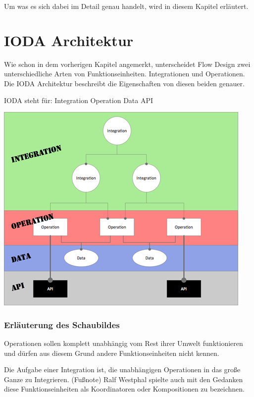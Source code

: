 Um was es sich dabei im Detail genau handelt, wird in diesem Kapitel erläutert.

\pagebreak
\section{IODA Architektur}

Wie schon in dem vorherigen Kapitel angemerkt, unterscheidet Flow Design zwei
unterschiedliche Arten von Funktionseinheiten. Integrationen und Operationen.
Die IODA Architektur beschreibt die Eigenschaften von diesen beiden genauer.

IODA steht für: Integration Operation Data API


\begin{center}
\includegraphics[width=.9\linewidth]{./img/ioda1.png}
\end{center}


\let\thefootnote\relax{}
\subsubsection{Erläuterung des Schaubildes}

Operationen sollen komplett unabhängig vom Rest ihrer Umwelt funktionieren und
dürfen aus diesem Grund andere Funktionseinheiten nicht kennen.

Die Aufgabe einer Integration ist, die unabhängigen Operationen in das große Ganze zu
Integrieren. 
(Fußnote) Ralf Westphal spielte auch mit den Gedanken diese Funktionseinheiten als Koordinatoren oder
Kompositionen zu bezeichnen.


